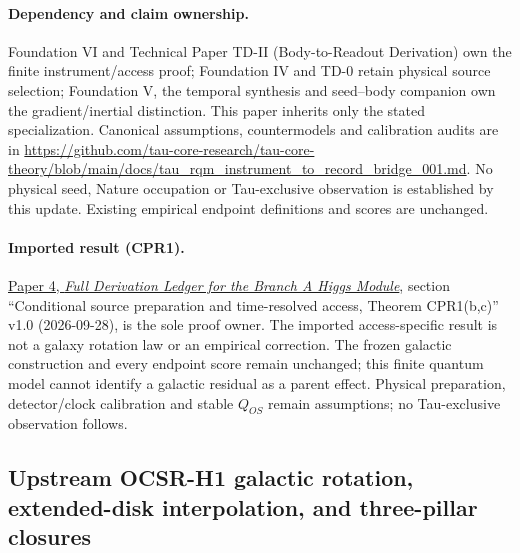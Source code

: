 \documentclass[11pt]{article}
\begin{document}
\paragraph{Dependency and claim ownership.}
Foundation VI and Technical Paper TD-II (Body-to-Readout Derivation) own the finite instrument/access proof; Foundation IV and TD-0 retain physical source selection; Foundation V, the temporal synthesis and seed--body companion own the gradient/inertial distinction. This paper inherits only the stated specialization. Canonical assumptions, countermodels and calibration audits are in \url{https://github.com/tau-core-research/tau-core-theory/blob/main/docs/tau_rqm_instrument_to_record_bridge_001.md}. No physical seed, Nature occupation or Tau-exclusive observation is established by this update. Existing empirical endpoint definitions and scores are unchanged.

\paragraph{Imported result (CPR1).}
\href{https://github.com/tau-core-research/tau-core-higgs-module-paper4/blob/main/paper4_full_derivation/full_derivation.pdf#nameddest=cpr1}{Paper 4, \emph{Full Derivation Ledger for the Branch A Higgs Module}}, section ``Conditional source preparation and time-resolved access, Theorem CPR1(b,c)'' v1.0 (2026-09-28), is the sole proof owner.
The imported access-specific result is not a galaxy rotation law or an empirical correction. The frozen galactic construction and every endpoint score remain unchanged; this finite quantum model cannot identify a galactic residual as a parent effect.
Physical preparation, detector/clock calibration and stable $Q_{OS}$ remain assumptions; no Tau-exclusive observation follows.

\subsection{Upstream OCSR-H1 galactic rotation, extended-disk interpolation, and three-pillar closures}
\label{sec:upstream-ocsr-galactic-20260929}
\end{document}
